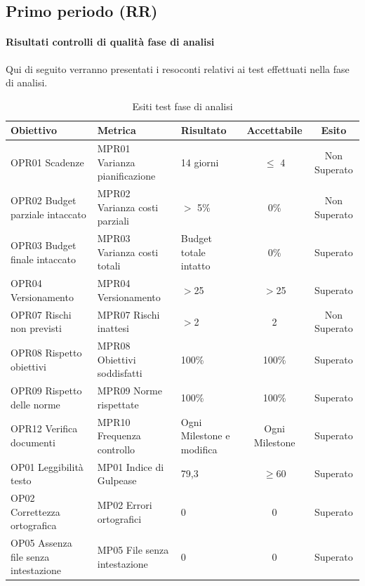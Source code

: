 \documentclass[../piano_di_qualifica.tex]{subfiles}
\begin{document}
\subsection{Primo periodo (RR)}
\label{sub:periodo-RR}
\paragraph{Risultati controlli di qualità fase di analisi}
Qui di seguito verranno presentati i resoconti relativi ai test effettuati nella fase di analisi. \par

\begin{table}[!ht]
	\centering
	\begin{tabular}{|p{4cm}|p{4cm}|l|c|c|}
		\hline
		\rowcolor{lightgray}
		\textbf{Obiettivo}            			& \textbf{Metrica}              & \textbf{Risultato}                    & \textbf{Accettabile} & \textbf{Esito} \\
		\hline
		OPR01 Scadenze		        			& MPR01 Varianza pianificazione & 14 giorni                             & $\leq$ 4           	& Non Superato   \\
		OPR02 Budget parziale intaccato        	& MPR02 Varianza costi parziali & $>$ 5\%								& 0\%                  	& Non Superato   \\
		OPR03 Budget finale intaccato        	& MPR03 Varianza costi totali   & Budget totale intatto					& 0\%                  	& Superato       \\
		OPR04 Versionamento						& MPR04 Versionamento			& $>$25									& $>$25					& Superato		 \\
		OPR07 Rischi non previsti				& MPR07 Rischi inattesi			& $>$2									& 2						& Non Superato	 \\
		OPR08 Rispetto obiettivi      			& MPR08 Obiettivi soddisfatti   & 100\%                                 & 100\%                	& Superato       \\
		OPR09 Rispetto delle norme   			& MPR09 Norme rispettate        & 100\%                                 & 100\%                	& Superato       \\
		OPR12 Verifica documenti      			& MPR10 Frequenza controllo     & Ogni Milestone e modifica         	& Ogni Milestone       	& Superato       \\
		OP01 Leggibilità testo       			& MP01 Indice di Gulpease      	& 79,3                                  & \(\ge 60\)           	& Superato       \\
		OP02 Correttezza ortografica 			& MP02 Errori ortografici      	& 0                                     & 0                    	& Superato       \\
		OP05 Assenza file senza intestazione	& MP05 File senza intestazione 	& 0										& 0						& Superato		 \\
		\hline
	\end{tabular}
	\caption{Esiti test fase di analisi}
\end{table}
\end{document}
